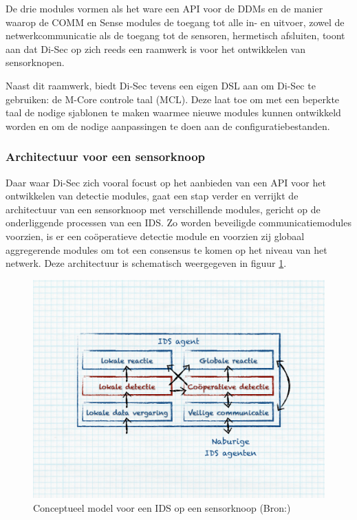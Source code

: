 De drie modules vormen als het ware een API voor de DDMs en de manier waarop de
COMM en Sense modules de toegang tot alle in- en uitvoer, zowel de
netwerkcommunicatie als de toegang tot de sensoren, hermetisch afsluiten, toont
aan dat Di-Sec op zich reeds een raamwerk is voor het ontwikkelen van
sensorknopen.

Naast dit raamwerk, biedt Di-Sec tevens een eigen DSL aan om Di-Sec te
gebruiken: de M-Core controle taal (MCL). Deze laat toe om met een beperkte
taal de nodige sjablonen te maken waarmee nieuwe modules kunnen ontwikkeld
worden en om de nodige aanpassingen te doen aan de configuratiebestanden.

\subsubsection*{Architectuur voor een sensorknoop}
\label{subsubsection:node-architecture}

Daar waar Di-Sec zich vooral focust op het aanbieden van een API voor het
ontwikkelen van detectie modules, gaat \citep{zhang2000intrusion} een stap
verder en verrijkt de architectuur van een sensorknoop met verschillende
modules, gericht op de onderliggende processen van een IDS. Zo worden
beveiligde communicatiemodules voorzien, is er een co\"operatieve detectie
module en voorzien zij globaal aggregerende modules om tot een consensus te
komen op het niveau van het netwerk. Deze architectuur is schematisch
weergegeven in figuur \ref{fig:node-architecture}.

\begin{figure}[ht]
  \centering
  \includegraphics[width=0.9\linewidth]{resources/node-architecture.pdf}
  \caption[Conceptueel model voor een IDS op een sensorknoop]{Conceptueel model
  voor een IDS op een sensorknoop (Bron:\citep{zhang2000intrusion})}
  \label{fig:node-architecture}
\end{figure}

